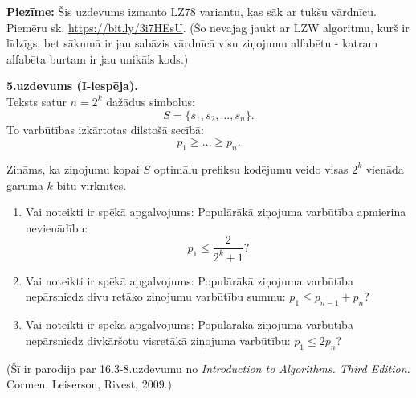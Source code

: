 \documentclass[a4paper,12pt]{article}
\begin{document}
{\bf Piezīme:} Šis uzdevums izmanto LZ78 variantu, kas sāk ar tukšu vārdnīcu. 
Piemēru sk. \url{https://bit.ly/3i7HEsU}. 
(Šo nevajag jaukt ar LZW algoritmu, kurš ir līdzīgs, bet sākumā ir jau sabāzis vārdnīcā 
visu ziņojumu alfabētu - katram alfabēta burtam ir jau unikāls kods.)




\vspace{10pt}
{\bf 5.uzdevums (I-iespēja).}\\
Teksts satur $n = 2^k$ dažādus simbolus:
$$S = \{ s_1,s_2,\ldots,s_n \}.$$
To
varbūtības izkārtotas dilstošā secībā:
$$p_1 \geq \ldots \geq p_n.$$

Zināms, ka ziņojumu kopai $S$
optimālu prefiksu ko\-dē\-ju\-mu veido visas
$2^k$ vienāda garuma $k$-bitu virk\-nī\-tes.

\begin{enumerate}
\item Vai noteikti ir spēkā apgalvojums: Populārākā ziņojuma varbūtība
apmierina nevienādību:
$${\displaystyle p_1 \leq \frac{2}{2^k + 1}}?$$
\item Vai noteikti ir spēkā apgalvojums: Populārākā ziņojuma varbūtība
nepārsniedz divu retāko ziņojumu varbūtību summu: $p_1 \leq p_{n-1} + p_{n}$?
\item Vai noteikti ir spēkā apgalvojums: Populārākā ziņojuma varbūtība
nepārsniedz divkāršotu visretākā ziņojuma varbūtību: $p_1 \leq 2p_n$?
\end{enumerate}

(Šī ir parodija par 16.3-8.uzdevumu no {\em Introduction to Algorithms. Third Edition.} Cormen, Leiserson, Rivest, 2009.)











\end{document}
